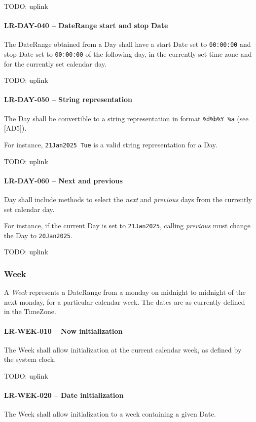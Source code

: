 TODO: uplink

\paragraph{LR-DAY-040 -- DateRange start and stop Date}
The DateRange obtained from a Day shall have a start Date set
to \lstinline{00:00:00} and stop Date set to \lstinline{00:00:00} of the
following day, in the currently set time zone and for the currently set calendar
day.

TODO: uplink

\paragraph{LR-DAY-050 -- String representation}
The Day shall be convertible to a string representation in format
\lstinline{%d%b%Y %a} (see [AD5]).

For instance, \lstinline{21Jan2025 Tue} is a valid string representation
for a Day.

TODO: uplink

\paragraph{LR-DAY-060 -- Next and previous}
Day shall include methods to select the \emph{next} and \emph{previous} days
from the currently set calendar day.

For instance, if the current Day is set to \lstinline{21Jan2025}, calling
\emph{previous} must change the Day to \lstinline{20Jan2025}.

TODO: uplink

\subsubsection{Week}
A \emph{Week} represents a DateRange from a monday on midnight to midnight of
the next monday, for a particular calendar week.
The dates are as currently defined in the TimeZone.

\paragraph{LR-WEK-010 -- Now initialization}
The Week shall allow initialization at the current calendar week, as defined by
the system clock.

TODO: uplink

\paragraph{LR-WEK-020 -- Date initialization}
The Week shall allow initialization to a week containing a given Date.

